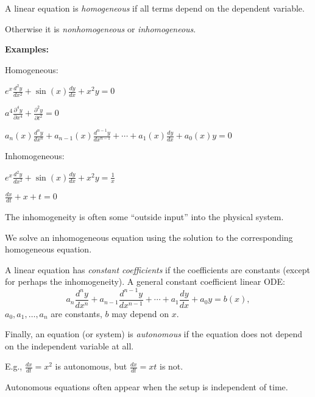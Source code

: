\documentclass[10pt,aspectratio=169]{beamer}
\begin{document}
\begin{frame}
A linear equation is \emph{homogeneous} if all terms depend on the dependent variable.

\pause
Otherwise it is \emph{nonhomogeneous} or \emph{inhomogeneous}.

\medskip
\pause

\textbf{Examples:}

\pause
\medskip

Homogeneous:

\pause
\vspace*{-12pt}
\hspace*{1.5in}$\displaystyle
e^x \frac{d^2 y}{dx^2} + 
\sin(x) \frac{d y}{dx} + 
x^2 y
=
0
$

\pause
\medskip

\hspace*{1.5in}$\displaystyle
a^4 \frac{\partial^4 y}{\partial x^4} + \frac{\partial^2 y}{\partial t^2} = 0
$

\pause
\medskip

\hspace*{1.5in}$\displaystyle
a_n(x) \frac{d^n y}{dx^n} + 
a_{n-1}(x) \frac{d^{n-1} y}{dx^{n-1}} + 
\cdots
+
a_{1}(x) \frac{dy}{dx}
+
a_{0}(x) y = 0
$

\pause
\medskip

Inhomogeneous:

\pause
\vspace*{-12pt}
\hspace*{1.5in}$\displaystyle
e^x \frac{d^2 y}{dx^2} + 
\sin(x) \frac{d y}{dx} + 
x^2 y
=
\frac{1}{x}
$

\pause
\medskip

\hspace*{1.5in}$\displaystyle
\frac{dx}{dt} + x + t = 0 
$

\pause
\medskip

The inhomogeneity is often some ``outside input'' into the physical
system.

\medskip
\pause

We solve an inhomogeneous equation using the solution to the corresponding
homogeneous equation.
\end{frame}

\begin{frame}
A linear equation has
\emph{constant coefficients} if the coefficients are constants (except for
perhaps the inhomogeneity).
\pause
A general constant coefficient linear ODE:
\[
a_n \frac{d^n y}{dx^n} + 
a_{n-1} \frac{d^{n-1} y}{dx^{n-1}} + 
\cdots
+
a_{1} \frac{dy}{dx}
+
a_{0} y = b(x) ,
\]
$a_0, a_1, \ldots, a_n$ are constants, $b$ may depend on $x$.

\medskip
\pause

Finally, an equation (or system) is \emph{autonomous} if the equation does
not depend on the independent variable at all.

\medskip
\pause

E.g., $\frac{dx}{dt}=x^2$
is autonomous, but $\frac{dx}{dt}=xt$ is not.

\medskip
\pause

Autonomous equations often appear when the setup is
independent of time.
\end{frame}
\end{document}
